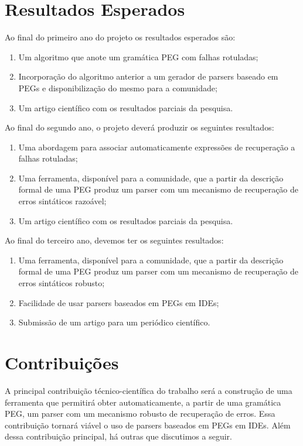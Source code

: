 \documentclass[titlepage,12pt]{article}
\begin{document}
\section{Resultados Esperados}
\label{sec:res}

Ao final do primeiro ano do projeto os resultados esperados são:
\begin{enumerate}
	\item Um algoritmo que anote um gramática PEG com falhas rotuladas;
	\item Incorporação do algoritmo anterior a um gerador de parsers baseado
  em PEGs e disponibilização do mesmo para a comunidade;
	\item Um artigo científico com os resultados parciais da pesquisa.
\end{enumerate}

Ao final do segundo ano, o projeto deverá produzir os seguintes resultados:
\begin{enumerate}
	\item Uma abordagem para associar automaticamente expressões
  de recuperação a falhas rotuladas;
	\item Uma ferramenta, disponível para a comunidade, que a partir da descrição formal
  de uma PEG produz um parser com um mecanismo de recuperação de erros sintáticos razoável;
  \item Um artigo científico com os resultados parciais da pesquisa.
\end{enumerate}

Ao final do terceiro ano, devemos ter os seguintes resultados:
\begin{enumerate}
	\item Uma ferramenta, disponível para a comunidade, que a partir da descrição formal
  de uma PEG produz um parser com um mecanismo de recuperação de erros sintáticos robusto;
  \item Facilidade de usar parsers baseados em PEGs em IDEs;
  \item Submissão de um artigo para um periódico científico.
\end{enumerate}



\section{Contribuições}
\label{sec:contrib}

A principal contribuição técnico-científica do trabalho será
a construção de uma ferramenta que permitirá obter automaticamente,
a partir de uma gramática PEG, um parser com um mecanismo robusto de
recuperação de erros. Essa contribuição tornará viável o uso de parsers
baseados em PEGs em IDEs. Além dessa contribuição principal, há outras
que discutimos a seguir.
\end{document}
